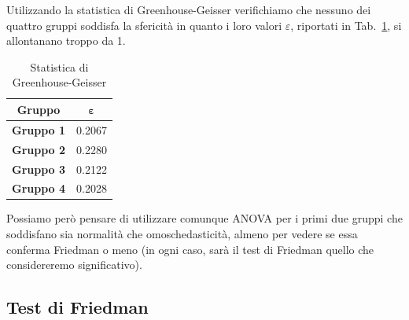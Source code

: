 \documentclass[conference]{IEEEtran}
\begin{document}
Utilizzando la statistica di Greenhouse-Geisser verifichiamo che nessuno dei quattro gruppi
soddisfa la sfericità in quanto i loro valori $\varepsilon$, riportati in Tab.~\ref{tab4},
si allontanano troppo da 1.
\begin{table}[htbp]
    \caption{Statistica di Greenhouse-Geisser}
    \begin{center}
    \begin{tabular}{|c|c|}
    \hline
    \textbf{Gruppo} & $\boldsymbol{\varepsilon}$\\
    \hline
    \textbf{Gruppo 1} & 0.2067 \\\cline{1-2}
    \textbf{Gruppo 2} & 0.2280 \\\cline{1-2}
    \textbf{Gruppo 3} & 0.2122 \\\cline{1-2}
    \textbf{Gruppo 4} & 0.2028 \\\cline{1-2}
    \hline
    \end{tabular}
    \label{tab4}
    \end{center}
\end{table}
Possiamo però pensare di utilizzare comunque ANOVA per i primi due gruppi
che soddisfano sia normalità che omoschedasticità, almeno per vedere
se essa conferma Friedman o meno (in ogni caso, sarà il test di Friedman
quello che considereremo significativo).

\subsection{Test di Friedman}
\end{document}
